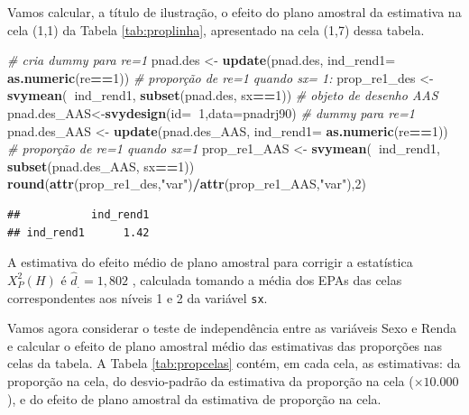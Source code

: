 \documentclass[]{book}
\newenvironment{Shaded}{\begin{snugshade}}{\end{snugshade}}
\newcommand{\KeywordTok}[1]{\textcolor[rgb]{0.13,0.29,0.53}{\textbf{#1}}}
\newcommand{\DataTypeTok}[1]{\textcolor[rgb]{0.13,0.29,0.53}{#1}}
\newcommand{\DecValTok}[1]{\textcolor[rgb]{0.00,0.00,0.81}{#1}}
\newcommand{\StringTok}[1]{\textcolor[rgb]{0.31,0.60,0.02}{#1}}
\newcommand{\CommentTok}[1]{\textcolor[rgb]{0.56,0.35,0.01}{\textit{#1}}}
\newcommand{\OperatorTok}[1]{\textcolor[rgb]{0.81,0.36,0.00}{\textbf{#1}}}
\newcommand{\NormalTok}[1]{#1}
\theoremstyle{definition}
\theoremstyle{definition}
\theoremstyle{definition}
\theoremstyle{remark}
\begin{document}
Vamos calcular, a título de ilustração, o efeito do plano amostral da
estimativa na cela (1,1) da Tabela \ref{tab:proplinha}, apresentado na
cela (1,7) dessa tabela.

\begin{Shaded}
\begin{Highlighting}[]
\CommentTok{# cria dummy para re=1}
\NormalTok{pnad.des <-}\StringTok{ }\KeywordTok{update}\NormalTok{(pnad.des, }
  \DataTypeTok{ind_rend1=} \KeywordTok{as.numeric}\NormalTok{(re}\OperatorTok{==}\DecValTok{1}\NormalTok{))}
\CommentTok{# proporção de re=1 quando  sx= 1:}
\NormalTok{prop_re1_des <-}\StringTok{ }\KeywordTok{svymean}\NormalTok{(}\OperatorTok{~}\NormalTok{ind_rend1, }\KeywordTok{subset}\NormalTok{(pnad.des, sx}\OperatorTok{==}\DecValTok{1}\NormalTok{))}
\CommentTok{# objeto de desenho AAS}
\NormalTok{pnad.des_AAS<-}\KeywordTok{svydesign}\NormalTok{(}\DataTypeTok{id=}\OperatorTok{~}\DecValTok{1}\NormalTok{,}\DataTypeTok{data=}\NormalTok{pnadrj90)}
\CommentTok{# dummy para re=1}
\NormalTok{pnad.des_AAS <-}\StringTok{ }\KeywordTok{update}\NormalTok{(pnad.des_AAS, }
  \DataTypeTok{ind_rend1=} \KeywordTok{as.numeric}\NormalTok{(re}\OperatorTok{==}\DecValTok{1}\NormalTok{))}
\CommentTok{# proporção de re=1 quando sx=1}
\NormalTok{prop_re1_AAS <-}\StringTok{ }\KeywordTok{svymean}\NormalTok{(}\OperatorTok{~}\NormalTok{ind_rend1, }\KeywordTok{subset}\NormalTok{(pnad.des_AAS, sx}\OperatorTok{==}\DecValTok{1}\NormalTok{))}
\KeywordTok{round}\NormalTok{(}\KeywordTok{attr}\NormalTok{(prop_re1_des,}\StringTok{"var"}\NormalTok{)}\OperatorTok{/}\KeywordTok{attr}\NormalTok{(prop_re1_AAS,}\StringTok{"var"}\NormalTok{),}\DecValTok{2}\NormalTok{)}
\end{Highlighting}
\end{Shaded}

\begin{verbatim}
##           ind_rend1
## ind_rend1      1.42
\end{verbatim}

A estimativa do efeito médio de plano amostral para corrigir a
estatística \(X_{P}^{2}\left( H\right)\) é \(\hat{d}_{.}=1,802\) ,
calculada tomando a média dos EPAs das celas correspondentes aos níveis
1 e 2 da variável \texttt{sx}.

Vamos agora considerar o teste de independência entre as variáveis Sexo
e Renda e calcular o efeito de plano amostral médio das estimativas das
proporções nas celas da tabela. A Tabela \ref{tab:propcelas} contém, em
cada cela, as estimativas: da proporção na cela, do desvio-padrão da
estimativa da proporção na cela (\(\times 10.000\)), e do efeito de
plano amostral da estimativa de proporção na cela.
\end{document}
